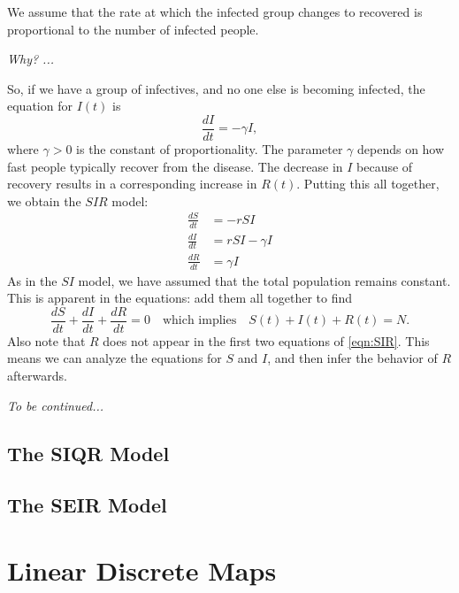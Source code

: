 \documentclass[reqno]{immbook}
\numberwithin{equation}{chapter}
\numberwithin{question}{section}
\numberwithin{theorem}{chapter}
\numberwithin{figure}{chapter}
\theoremstyle{definition}
\begin{document}
We assume that the rate at which the infected
group changes to recovered is proportional to
the number of infected people.

\emph{Why? ...}

So, if we have a group of infectives, and no
one else is becoming infected, the equation
for $I(t)$ is
\begin{equation}
  \frac{dI}{dt} = -\gamma I,
\end{equation}
where $\gamma > 0$ is the constant of proportionality.
The parameter $\gamma$ depends on how fast people
typically recover from the disease.
The decrease in $I$ because of recovery results
in a corresponding increase in $R(t)$.
Putting this all together, we obtain the
$SIR$ model:
\begin{equation}
\begin{split}
   \frac{dS}{dt} & = -r S I \\
   \frac{dI}{dt} & = r S I - \gamma I \\
   \frac{dR}{dt} & = \gamma I
\end{split}
\label{eqn:SIR}
\end{equation}
As in the $SI$ model, we have assumed that the total
population remains constant.  This is apparent in the equations:
add them all together to find
\begin{equation}
   \frac{dS}{dt} + \frac{dI}{dt} + \frac{dR}{dt} = 0
   \quad \textrm{which implies} \quad
   S(t) + I(t) + R(t) = N.
\end{equation}
Also note that $R$ does not appear in the first two equations
of \eqref{eqn:SIR}.  This means we can analyze the equations
for $S$ and $I$, and then infer the behavior of $R$ afterwards.

\medskip
\noindent
\emph{To be continued...}


\section{The SIQR Model}
\section{The SEIR Model}
%
%
%

\chapter{Linear Discrete Maps}
%
%
\end{document}
